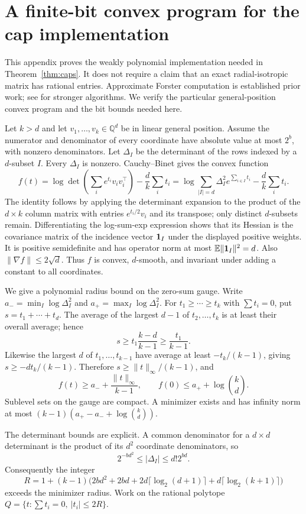 \section{A finite-bit convex program for the cap implementation}\label{app:convex}
This appendix proves the weakly polynomial implementation needed in Theorem~\ref{thm:caps}. It does not require a claim that an exact radial-isotropic matrix has rational entries. Approximate Forster computation is established prior work; see \citet{DKT22} for stronger algorithms. We verify the particular general-position convex program and the bit bounds needed here.

Let $k>d$ and let $v_1,\ldots,v_k\in\mathbb Q^d$ be in linear general position. Assume the numerator and denominator of every coordinate have absolute value at most $2^b$, with nonzero denominators. Let $\Delta_I$ be the determinant of the rows indexed by a $d$-subset $I$. Every $\Delta_I$ is nonzero. Cauchy--Binet gives the convex function
\begin{equation}\label{eq:barthe}
 f(t)=\log\det\left(\sum_i e^{t_i}v_iv_i^\top\right)-\frac dk\sum_i t_i
 =\log\sum_{|I|=d}\Delta_I^2e^{\sum_{i\in I}t_i}-\frac dk\sum_i t_i.
\end{equation}
The identity follows by applying the determinant expansion to the product of the $d\times k$ column matrix with entries $e^{t_i/2}v_i$ and its transpose; only distinct $d$-subsets remain. Differentiating the log-sum-exp expression shows that its Hessian is the covariance matrix of the incidence vector $\mathbf 1_I$ under the displayed positive weights. It is positive semidefinite and has operator norm at most $\mathbb E\|\mathbf 1_I\|^2=d$. Also $\|\nabla f\|\le2\sqrt d$. Thus $f$ is convex, $d$-smooth, and invariant under adding a constant to all coordinates.

We give a polynomial radius bound on the zero-sum gauge. Write $a_- =\min_I\log\Delta_I^2$ and $a_+=\max_I\log\Delta_I^2$. For $t_1\ge\cdots\ge t_k$ with $\sum t_i=0$, put $s=t_1+\cdots+t_d$. The average of the largest $d-1$ of $t_2,\ldots,t_k$ is at least their overall average; hence
\[
 s\ge t_1\frac{k-d}{k-1}\ge\frac{t_1}{k-1}.
\]
Likewise the largest $d$ of $t_1,\ldots,t_{k-1}$ have average at least $-t_k/(k-1)$, giving $s\ge -dt_k/(k-1)$. Therefore $s\ge\|t\|_\infty/(k-1)$, and
\[
 f(t)\ge a_-+\frac{\|t\|_\infty}{k-1},\qquad
 f(0)\le a_++\log\binom kd.
\]
Sublevel sets on the gauge are compact. A minimizer exists and has infinity norm at most $(k-1)(a_+-a_-+\log\binom kd)$.

The determinant bounds are explicit. A common denominator for a $d\times d$ determinant is the product of its $d^2$ coordinate denominators, so
\[
 2^{-bd^2}\le|\Delta_I|\le d!2^{bd}.
\]
Consequently the integer
\[
 R=1+(k-1)\bigl(2bd^2+2bd+2d\lceil\log_2(d+1)\rceil
 +d\lceil\log_2(k+1)\rceil\bigr)
\]
exceeds the minimizer radius. Work on the rational polytope
$Q=\{t:\sum t_i=0,\ |t_i|\le2R\}$.

